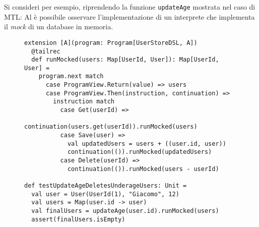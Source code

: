 Si consideri per esempio, riprendendo la funzione \lstinline{updateAge} mostrata nel caso di MTL:
Al  è possibile osservare l'implementazione di un interprete che implementa il \emph{mock} di un database in memoria.

\begin{figure}
  \begin{lstlisting}[language=scala3, label={lst:mock-free}, caption={Esempio di un interprete di test per un programma che usa lo \lstinline{UserStoreDSL}. In questo caso l'uso di una mappa degli utenti permette di testare semplicemente la logica applicativa delle operazioni}]
extension [A](program: Program[UserStoreDSL, A])
  @tailrec
  def runMocked(users: Map[UserId, User]): Map[UserId, User] =
    program.next match
      case ProgramView.Return(value) => users
      case ProgramView.Then(instruction, continuation) =>
        instruction match
          case Get(userId) =>
            continuation(users.get(userId)).runMocked(users)
          case Save(user) =>
            val updatedUsers = users + ((user.id, user))
            continuation(()).runMocked(updatedUsers)
          case Delete(userId) =>
            continuation(()).runMocked(users - userId)

def testUpdateAgeDeletesUnderageUsers: Unit =
  val user = User(UserId(1), "Giacomo", 12)
  val users = Map(user.id -> user)
  val finalUsers = updateAge(user.id).runMocked(users)
  assert(finalUsers.isEmpty)
  \end{lstlisting}
\end{figure}
